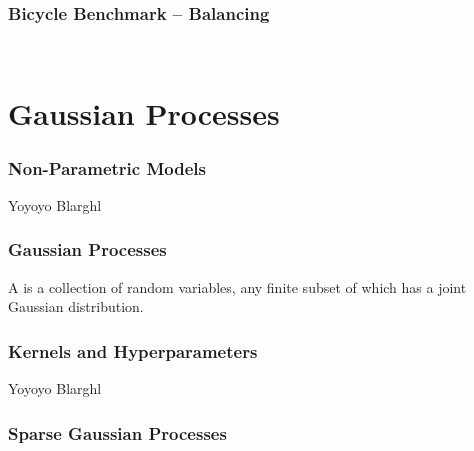 \begin{frame}[label=bicycle_balance]
    \frametitle{Bicycle Benchmark -- Balancing}

    \vfill
    \begin{columns}
        \begin{column}{0.45\textwidth}
            \centering
            
        \end{column}
        \begin{column}{0.55\textwidth}
            \centering
             {
            }
        \end{column}
    \end{columns}
\end{frame}

\section{Gaussian Processes}
\begin{frame}[label=gp_non_parametric_models]
    \frametitle{Non-Parametric Models}

    \begin{block}{Yoyoyo}
        Blarghl
    \end{block}
    \vfill
    \centering
\end{frame}

\begin{frame}[label=gp_definition]
    \frametitle{Gaussian Processes}

    \begin{definition}
        A  is a collection of random variables, any finite subset of which has a joint Gaussian distribution.
    \end{definition}
\end{frame}

\begin{frame}[label=gp_kernels]
    \frametitle{Kernels and Hyperparameters}

    \begin{block}{Yoyoyo}
        Blarghl
    \end{block}
    \vfill
    \centering
\end{frame}

\begin{frame}[label=gp_sparse]
    \frametitle{Sparse Gaussian Processes}

    \centering
\end{frame}

